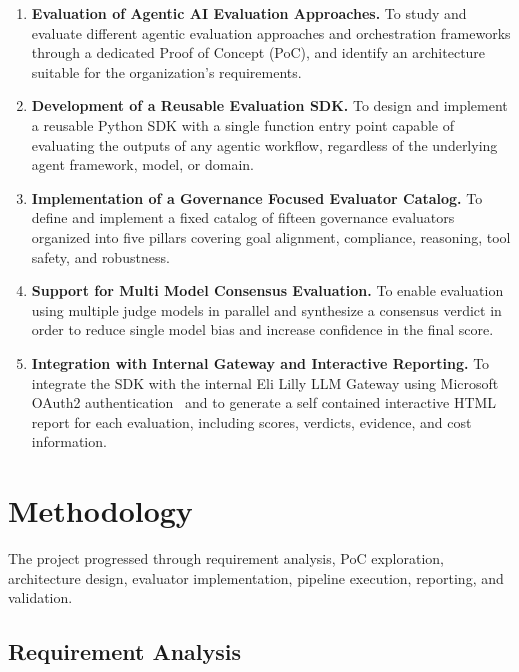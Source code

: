 \documentclass[12pt, a4paper, oneside]{report}
\begin{document}
\begin{enumerate}

\item \textbf{Evaluation of Agentic AI Evaluation Approaches.}
To study and evaluate different agentic evaluation approaches and orchestration frameworks through a dedicated Proof of Concept (PoC), and identify an architecture suitable for the organization's requirements.

\item \textbf{Development of a Reusable Evaluation SDK.}
To design and implement a reusable Python SDK with a single function entry point capable of evaluating the outputs of any agentic workflow, regardless of the underlying agent framework, model, or domain.

\item \textbf{Implementation of a Governance Focused Evaluator Catalog.}
To define and implement a fixed catalog of fifteen governance evaluators organized into five pillars covering goal alignment, compliance, reasoning, tool safety, and robustness.

\item \textbf{Support for Multi Model Consensus Evaluation.}
To enable evaluation using multiple judge models in parallel and synthesize a consensus verdict in order to reduce single model bias and increase confidence in the final score.

\item \textbf{Integration with Internal Gateway and Interactive Reporting.}
To integrate the SDK with the internal Eli Lilly LLM Gateway using Microsoft OAuth2 authentication~\cite{msoauth2} and to generate a self contained interactive HTML report for each evaluation, including scores, verdicts, evidence, and cost information.

\end{enumerate}

\chapter{Methodology}

The project progressed through requirement analysis, PoC exploration, architecture design, evaluator implementation, pipeline execution, reporting, and validation.

\section{Requirement Analysis}
\end{document}
